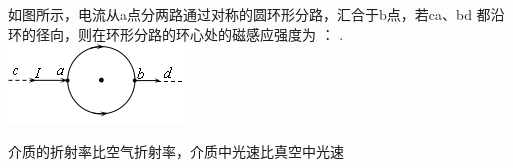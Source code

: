 \documentclass{njustexam}
\begin{document}
\begin{problem}
  如图所示，电流从a点分两路通过对称的圆环形分路，汇合于b点，若ca、bd 都沿环的径向，则在环形分路的环心处的磁感应强度为 ： .
  \includegraphics{Picture2.png}
\end{problem}




\begin{problem}
介质的折射率比空气折射率，介质中光速比真空中光速
\end{problem}











\end{document}
